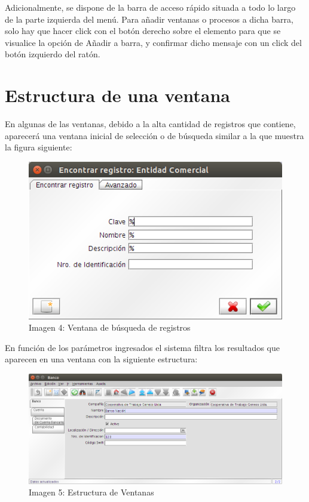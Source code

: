 \documentclass[letterpaper,10pt,spanish]{sphinxmanual}
\begin{document}
Adicionalmente, se dispone de la barra de acceso rápido situada a todo lo largo de la parte izquierda del menú. Para añadir ventanas o procesos a dicha barra, solo hay que hacer click con el botón derecho sobre el elemento para que se visualice la opción de Añadir a barra, y confirmar dicho mensaje con un click del botón izquierdo del ratón.


\section{Estructura de una ventana}
\label{estructura:estructura-de-una-ventana}
En algunas de las ventanas, debido a la alta cantidad de registros que contiene, aparecerá una ventana inicial de selección o de búsqueda similar a la que muestra la figura siguiente:
\begin{figure}[htbp]
\centering
\capstart

\includegraphics{ly_busqueda.png}
\caption{Imagen 4: Ventana de búsqueda de registros}\end{figure}

En función de los parámetros ingresados el sistema filtra los resultados que aparecen en una ventana con la siguiente estructura:
\begin{figure}[htbp]
\centering
\capstart

\includegraphics{ly_banco.png}
\caption{Imagen 5: Estructura de Ventanas}\end{figure}
\end{document}
